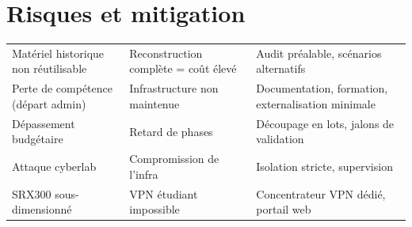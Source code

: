 \section{Risques et mitigation}
\begin{xltabular}{\textwidth}{@{}lXX@{}}
\toprule
{} &  &  \\
\midrule
\endhead
\bottomrule
\endfoot
\bottomrule
\endlastfoot
Matériel historique non réutilisable & Reconstruction complète = coût élevé & Audit préalable, scénarios alternatifs \\
Perte de compétence (départ admin) & Infrastructure non maintenue & Documentation, formation, externalisation minimale \\
Dépassement budgétaire & Retard de phases & Découpage en lots, jalons de validation \\
Attaque cyberlab & Compromission de l'infra & Isolation stricte, supervision \\
SRX300 sous-dimensionné & VPN étudiant impossible & Concentrateur VPN dédié, portail web \\

\end{xltabular}
